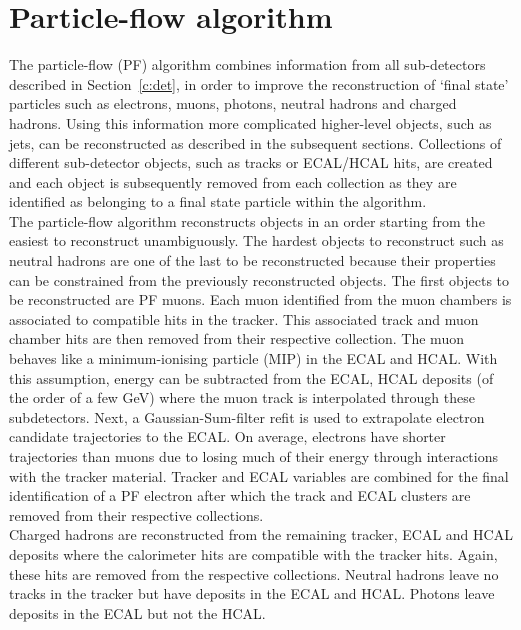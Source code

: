 \section{Particle-flow algorithm ~\label{sec:PF}}

The particle-flow (PF) algorithm combines information from all sub-detectors described in Section~\ref{c:det}, in order to improve the reconstruction of `final state' particles such as electrons, muons, photons, neutral hadrons and charged hadrons. Using this information more complicated higher-level objects, such as jets, can be reconstructed as described in the subsequent sections. Collections of different sub-detector objects, such as tracks or ECAL/HCAL hits, are created and each object is subsequently removed from each collection as they are identified as belonging to a final state particle within the algorithm.\\
The particle-flow algorithm reconstructs objects in an order starting from the easiest to reconstruct unambiguously. The hardest objects to reconstruct such as neutral hadrons are one of the last to be reconstructed because their properties can be constrained from the previously reconstructed objects.
The first objects to be reconstructed are PF muons. Each muon identified from the muon chambers is associated to compatible hits in the tracker. This associated track and muon chamber hits are then removed from their respective collection. The muon behaves like a minimum-ionising particle (MIP) in the ECAL and HCAL. With this assumption, energy can be subtracted from the ECAL, HCAL deposits (of the order of a few GeV) where the muon track is interpolated through these subdetectors.  Next, a Gaussian-Sum-filter refit is used to extrapolate electron candidate trajectories to the ECAL. On average, electrons have shorter trajectories than muons due to losing much of their energy through interactions with the tracker material. Tracker and ECAL variables are combined for the final identification of a PF electron after which the track and ECAL clusters are removed from their respective collections.\\
Charged hadrons are reconstructed from the remaining tracker, ECAL and HCAL deposits where the calorimeter hits are compatible with the tracker hits. Again, these hits are removed from the respective collections. Neutral hadrons leave no tracks in the tracker but have deposits in the ECAL and HCAL. Photons leave deposits in the ECAL but not the HCAL.\\


